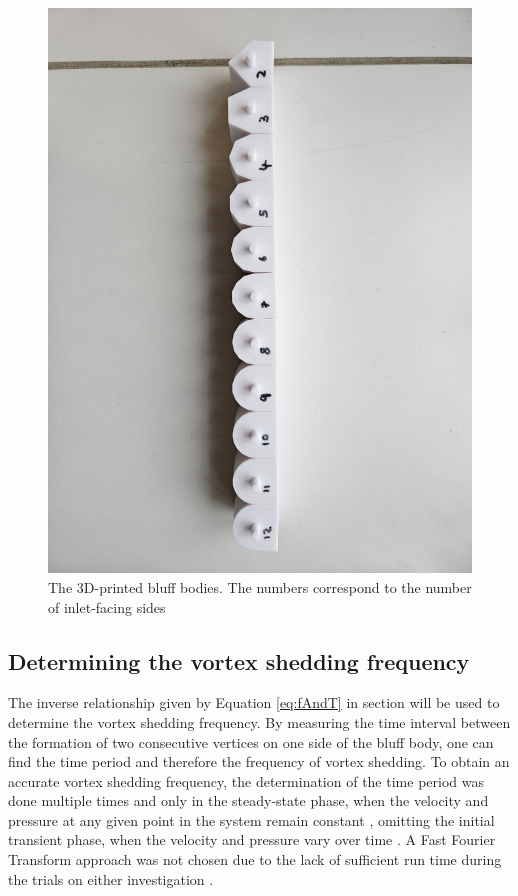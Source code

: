 \begin{figure}[H]
	\centering
	\includegraphics[width=\textwidth]{images/shapes.jpg}
	\caption{The 3D-printed bluff bodies. The numbers correspond to the number of inlet-facing sides}
	\label{fig:shapes}
\end{figure}


\subsection{Determining the vortex shedding frequency}
The inverse relationship given by Equation \eqref{eq:fAndT} in section  will be used to determine the vortex shedding frequency. By measuring the time interval between the formation of two consecutive vertices on one side of the bluff body, one can find the time period and therefore the frequency of vortex shedding. To obtain an accurate vortex shedding frequency, the determination of the time period was done multiple times and only in the steady-state phase, when the velocity and pressure at any given point in the system remain constant \parencite{noauthor_steady_nodate}, omitting the initial transient phase, when the velocity and pressure vary over time \parencite{noauthor_transient_nodate}. A Fast Fourier Transform approach was not chosen due to the lack of sufficient run time during the trials on either investigation \parencites[10--11]{shi2025vortex}[12]{xu_experimental_2025}.

